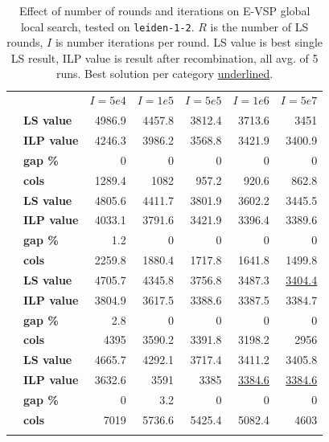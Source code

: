 \documentclass[]{article}
\begin{document}
\begin{table}[h]
  \centering
  \begin{tabular}{llrrrrr}
    \toprule
    && $I=5e4$ & $I=1e5$ & $I=5e5$ & $I=1e6$ & $I=5e7$  \\
    \arrayrulecolor{black!30}\cmidrule(lr){1-7}
    \addlinespace[0.4em]
    \multirow{4}{*}{$R=100$} & \textbf{LS value}  & 4986.9 & 4457.8 & 3812.4 & 3713.6 & 3451 \\
    & \textbf{ILP value}   & 4246.3 & 3986.2 & 3568.8 & 3421.9 & 3400.9 \\
    & \textbf{gap \%} & 0 & 0 & 0 & 0 & 0 \\
    & \textbf{cols} & 1289.4 & 1082 & 957.2 & 920.6 & 862.8 \\
    \arrayrulecolor{black!30}\cmidrule(lr){1-7}
    \multirow{4}{*}{$R=200$} & \textbf{LS value}  & 4805.6 & 4411.7 & 3801.9 & 3602.2 & 3445.5 \\
    & \textbf{ILP value}   & 4033.1 & 3791.6 & 3421.9 & 3396.4 & 3389.6 \\
    & \textbf{gap \%} & 1.2 & 0 & 0 & 0 & 0 \\
    & \textbf{cols} & 2259.8 & 1880.4 & 1717.8 & 1641.8 & 1499.8 \\
    \arrayrulecolor{black!30}\cmidrule(lr){1-7}
    \multirow{4}{*}{$R=500$} & \textbf{LS value}  & 4705.7 & 4345.8 & 3756.8 & 3487.3 & \underline{3404.4} \\
    & \textbf{ILP value}   & 3804.9 & 3617.5 & 3388.6 & 3387.5 & 3384.7 \\
    & \textbf{gap \%} & 2.8 & 0 & 0 & 0 & 0 \\
    & \textbf{cols} & 4395 & 3590.2 & 3391.8 & 3198.2 & 2956 \\
    \arrayrulecolor{black!30}\cmidrule(lr){1-7}
    \multirow{4}{*}{$R=1000$} & \textbf{LS value}  & 4665.7 & 4292.1 & 3717.4 & 3411.2 & 3405.8 \\
    & \textbf{ILP value}   & 3632.6 & 3591 & 3385 & \underline{3384.6} & \underline{3384.6} \\
    & \textbf{gap \%} & 0 & 3.2 & 0 & 0 & 0 \\
    & \textbf{cols} & 7019 & 5736.6 & 5425.4 & 5082.4 & 4603 \\
    \arrayrulecolor{black}\bottomrule
  \end{tabular}
  \caption{Effect of number of rounds and iterations on E-VSP global local search, tested on \texttt{leiden-1-2}. $R$ is the number of LS rounds, $I$ is number iterations per round. LS value is best single LS result, ILP value is result after recombination, all avg. of 5 runs. Best solution per category \underline{underlined}.}
  \label{tab:evsp-ls-global}
\end{table}
\end{document}
